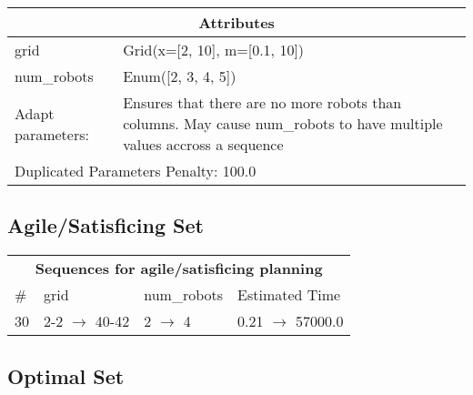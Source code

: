 \documentclass{article}
\begin{document}
                    \begin{center}
                    \begin{tabular}{p{}p{}}
                    \multicolumn{2}{c}{\bf \large Attributes}\\\midrule
                    grid & Grid(x=[2, 10], m=[0.1, 10])\\
num\_robots & Enum([2, 3, 4, 5])
                    
                    \\\midrule
                    Adapt parameters: & Ensures that there are no more robots than columns. May cause num\_robots to have multiple values accross a sequence
                
                     \\\midrule
                    \multicolumn{2}{l}{Duplicated Parameters Penalty: 100.0}
                    \end{tabular}
                    \end{center}
                
                         \subsection*{Agile/Satisficing Set}

                        \begin{center}
                        \begin{tabular}{l|l|l|l}
                        \multicolumn{4}{c}{\bf \large Sequences for agile/satisficing planning}\\
                        \# & grid & num\_robots & Estimated Time\\\midrule
                        30&2-2 $\rightarrow$ 40-42&2 $\rightarrow$ 4&0.21 $\rightarrow$ 57000.0
                        \end{tabular}
                        \end{center}
                    
                            \subsection*{Optimal Set}
\end{document}
